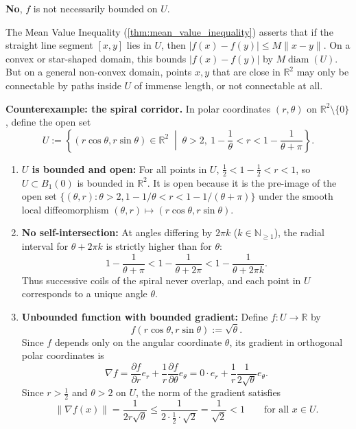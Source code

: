 \begin{exercisesolution}
\label{sol:bounded_gradient_unbounded_function}
\textbf{No}, $f$ is not necessarily bounded on $U$.

The Mean Value Inequality (\cref{thm:mean_value_inequality}) asserts that if the straight line
segment $[x, y]$ lies in $U$, then $|f(x) - f(y)| \leq M \|x - y\|$. On a convex or star-shaped domain,
this bounds $|f(x) - f(y)|$ by $M \operatorname{diam}(U)$. But on a general non-convex domain, points
$x, y$ that are close in $\mathbb{R}^2$ may only be connectable by paths inside $U$ of immense length,
or not connectable at all.

\textbf{Counterexample: the spiral corridor.}
In polar coordinates $(r, \theta)$ on $\mathbb{R}^2 \setminus \{0\}$, define the open set
\[
U := \left\{ (r\cos\theta, r\sin\theta) \in \mathbb{R}^2 \;\middle|\; \theta > 2, \ 1 - \frac{1}{\theta} < r < 1 - \frac{1}{\theta + \pi} \right\}.
\]
\begin{enumerate}[label=\textbf{(\alph*)}]
  \item \textbf{$U$ is bounded and open:} For all points in $U$, $\frac{1}{2} < 1 - \frac{1}{2} < r < 1$, so $U \subset B_1(0)$ is bounded in $\mathbb{R}^2$. It is open because it is the pre-image of the open set $\{(\theta, r) : \theta > 2, 1 - 1/\theta < r < 1 - 1/(\theta+\pi)\}$ under the smooth local diffeomorphism $(\theta, r) \mapsto (r\cos\theta, r\sin\theta)$.
  \item \textbf{No self-intersection:} At angles differing by $2\pi k$ ($k \in \mathbb{N}_{\geq 1}$), the radial interval for $\theta + 2\pi k$ is strictly higher than for $\theta$:
    \[1 - \frac{1}{\theta + \pi} < 1 - \frac{1}{\theta + 2\pi} < 1 - \frac{1}{\theta + 2\pi k}.\]
    Thus successive coils of the spiral never overlap, and each point in $U$ corresponds to a unique angle $\theta$.
  \item \textbf{Unbounded function with bounded gradient:} Define $f : U \to \mathbb{R}$ by
    \[f(r\cos\theta, r\sin\theta) := \sqrt{\theta}.\]
    Since $f$ depends only on the angular coordinate $\theta$, its gradient in orthogonal polar coordinates is
    \[\nabla f = \frac{\partial f}{\partial r} e_r + \frac{1}{r} \frac{\partial f}{\partial \theta} e_\theta = 0 \cdot e_r + \frac{1}{r} \frac{1}{2\sqrt{\theta}} e_\theta.\]
    Since $r > \frac{1}{2}$ and $\theta > 2$ on $U$, the norm of the gradient satisfies
    \[\|\nabla f(x)\| = \frac{1}{2r\sqrt{\theta}} \leq \frac{1}{2 \cdot \frac{1}{2} \cdot \sqrt{2}} = \frac{1}{\sqrt{2}} < 1 \qquad \text{for all } x \in U.\]

\end{enumerate}
\end{exercisesolution}
